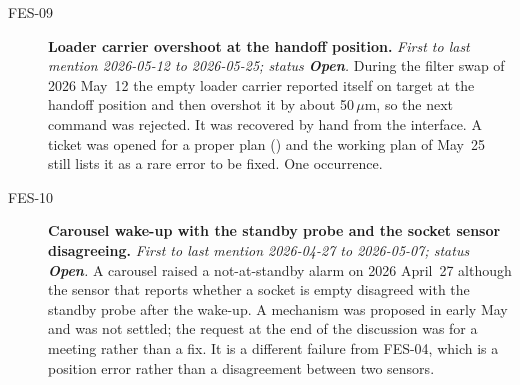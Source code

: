 \begin{description}
\item[FES-09]\label{iss:FES-09} \textbf{Loader carrier overshoot at the handoff position.}
  \emph{First to last mention 2026-05-12 to 2026-05-25; status \textcolor{stopn}{\textbf{Open}}.}
  During the filter swap of 2026 May~12 the empty loader carrier reported itself on target at the handoff position and then overshot it by about 50\,$\mu$m, so the next command was rejected.  It was recovered by hand from the interface.  A ticket was opened for a proper plan () and the working plan of May~25 still lists it as a rare error to be fixed.  One occurrence.

\item[FES-10]\label{iss:FES-10} \textbf{Carousel wake-up with the standby probe and the socket sensor disagreeing.}
  \emph{First to last mention 2026-04-27 to 2026-05-07; status \textcolor{stopn}{\textbf{Open}}.}
  A carousel raised a not-at-standby alarm on 2026 April~27 although the sensor that reports whether a socket is empty disagreed with the standby probe after the wake-up.  A mechanism was proposed in early May and was not settled; the request at the end of the discussion was for a meeting rather than a fix.  It is a different failure from FES-04, which is a position error rather than a disagreement between two sensors.

\end{description}

